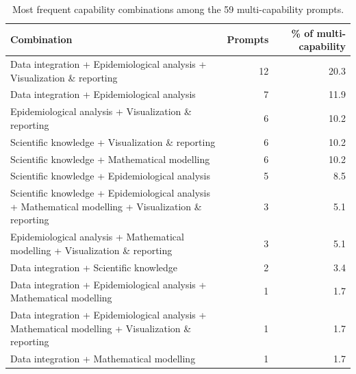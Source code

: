 \begin{table}[htbp]
\centering
\caption{Most frequent capability combinations among the 59 multi-capability prompts.}
\label{tab:s5-combinations}
\begin{tabular}{lrr}
\toprule
Combination & Prompts & \% of multi-capability \\
\midrule
Data integration + Epidemiological analysis + Visualization \& reporting & 12 & 20.3 \\
Data integration + Epidemiological analysis & 7 & 11.9 \\
Epidemiological analysis + Visualization \& reporting & 6 & 10.2 \\
Scientific knowledge + Visualization \& reporting & 6 & 10.2 \\
Scientific knowledge + Mathematical modelling & 6 & 10.2 \\
Scientific knowledge + Epidemiological analysis & 5 & 8.5 \\
Scientific knowledge + Epidemiological analysis + Mathematical modelling + Visualization \& reporting & 3 & 5.1 \\
Epidemiological analysis + Mathematical modelling + Visualization \& reporting & 3 & 5.1 \\
Data integration + Scientific knowledge & 2 & 3.4 \\
Data integration + Epidemiological analysis + Mathematical modelling & 1 & 1.7 \\
Data integration + Epidemiological analysis + Mathematical modelling + Visualization \& reporting & 1 & 1.7 \\
Data integration + Mathematical modelling & 1 & 1.7 \\
\bottomrule
\end{tabular}
\par{}
\end{table}
